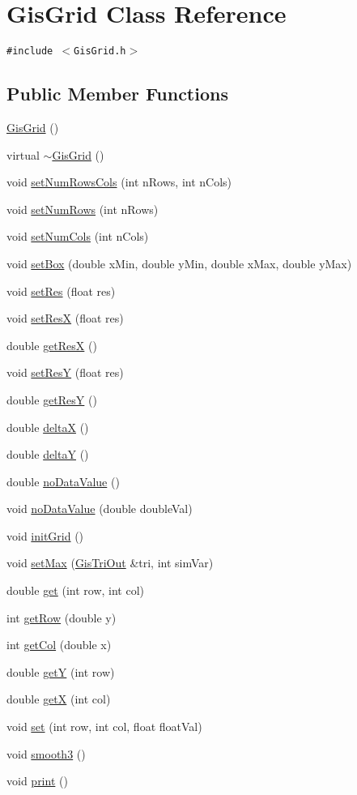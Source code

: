 \hypertarget{classGisGrid}{
\section{Gis\-Grid Class Reference}
\label{classGisGrid}
}
{\tt \#include $<$Gis\-Grid.h$>$}

\subsection*{Public Member Functions}
\begin{CompactItemize}
\item 
\hyperlink{classGisGrid_a0}{Gis\-Grid} ()
\item 
virtual \hyperlink{classGisGrid_a1}{$\sim$Gis\-Grid} ()
\item 
void \hyperlink{classGisGrid_a2}{set\-Num\-Rows\-Cols} (int n\-Rows, int n\-Cols)
\item 
void \hyperlink{classGisGrid_a3}{set\-Num\-Rows} (int n\-Rows)
\item 
void \hyperlink{classGisGrid_a4}{set\-Num\-Cols} (int n\-Cols)
\item 
void \hyperlink{classGisGrid_a5}{set\-Box} (double x\-Min, double y\-Min, double x\-Max, double y\-Max)
\item 
void \hyperlink{classGisGrid_a6}{set\-Res} (float res)
\item 
void \hyperlink{classGisGrid_a7}{set\-Res\-X} (float res)
\item 
double \hyperlink{classGisGrid_a8}{get\-Res\-X} ()
\item 
void \hyperlink{classGisGrid_a9}{set\-Res\-Y} (float res)
\item 
double \hyperlink{classGisGrid_a10}{get\-Res\-Y} ()
\item 
double \hyperlink{classGisGrid_a11}{delta\-X} ()
\item 
double \hyperlink{classGisGrid_a12}{delta\-Y} ()
\item 
double \hyperlink{classGisGrid_a13}{no\-Data\-Value} ()
\item 
void \hyperlink{classGisGrid_a14}{no\-Data\-Value} (double double\-Val)
\item 
void \hyperlink{classGisGrid_a15}{init\-Grid} ()
\item 
void \hyperlink{classGisGrid_a16}{set\-Max} (\hyperlink{classGisTriOut}{Gis\-Tri\-Out} \&tri, int sim\-Var)
\item 
double \hyperlink{classGisGrid_a17}{get} (int row, int col)
\item 
int \hyperlink{classGisGrid_a18}{get\-Row} (double y)
\item 
int \hyperlink{classGisGrid_a19}{get\-Col} (double x)
\item 
double \hyperlink{classGisGrid_a20}{get\-Y} (int row)
\item 
double \hyperlink{classGisGrid_a21}{get\-X} (int col)
\item 
void \hyperlink{classGisGrid_a22}{set} (int row, int col, float float\-Val)
\item 
void \hyperlink{classGisGrid_a23}{smooth3} ()
\item 
void \hyperlink{classGisGrid_a24}{print} ()
\end{CompactItemize}
